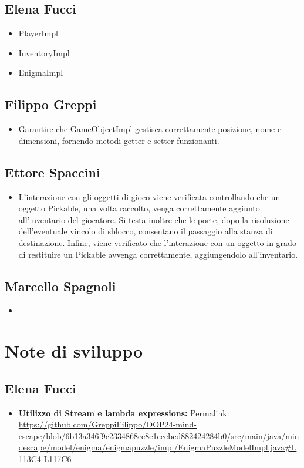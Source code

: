 \documentclass[a4paper,12pt]{report}
\begin{document}
\subsection{Elena Fucci}
\begin{itemize}
	\item PlayerImpl
	\item InventoryImpl
	\item EnigmaImpl
\end{itemize}

\subsection{Filippo Greppi}
\begin{itemize}
	\item Garantire che GameObjectImpl gestisca correttamente posizione, nome e dimensioni, fornendo metodi getter e setter funzionanti.
\end{itemize}

\subsection{Ettore Spaccini}
\begin{itemize}
	\item L'interazione con gli oggetti di gioco viene verificata controllando che un oggetto Pickable, una volta raccolto, venga correttamente aggiunto all’inventario del giocatore. Si testa inoltre che le porte, dopo la risoluzione dell’eventuale vincolo di sblocco, consentano il passaggio alla stanza di destinazione. Infine, viene verificato che l’interazione con un oggetto in grado di restituire un Pickable avvenga correttamente, aggiungendolo all’inventario.
\end{itemize}

\subsection{Marcello Spagnoli}
\begin{itemize}
	\item
\end{itemize}
%
\section{Note di sviluppo}
%
\subsection{Elena Fucci}
%
\begin{itemize}
	\item \textbf{Utilizzo di Stream e lambda expressions:}
	Permalink: \url{https://github.com/GreppiFilippo/OOP24-mind-escape/blob/6b13a346f9c2334868ee8e1ccebcd882424284b0/src/main/java/mindescape/model/enigma/enigmapuzzle/impl/EnigmaPuzzleModelImpl.java#L113C4-L117C6}
\end{itemize}
%
\end{document}

